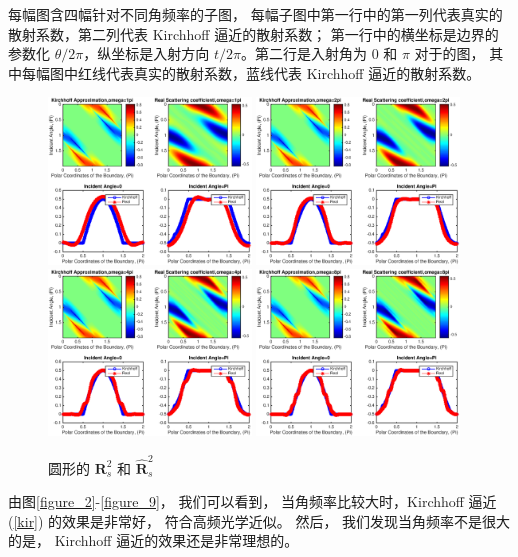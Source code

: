 { 每幅图含四幅针对不同角频率的子图， 每幅子图中第一行中的第一列代表真实的散射系数，第二列代表 Kirchhoff 逼近的散射系数； 第一行中的横坐标是边界的参数化 $\theta/2\pi$，纵坐标是入射方向 $t/2\pi$。第二行是入射角为 $0$ 和 $\pi$ 对于的图， 其中每幅图中红线代表真实的散射系数，蓝线代表 Kirchhoff 逼近的散射系数。
\begin{figure}[htbp]
	\centering
	\includegraphics[width=0.48\textwidth]{./Img/figure_sc_elastic/sc_s2_circle_1.eps}
	\includegraphics[width=0.48\textwidth]{./Img/figure_sc_elastic/sc_s2_circle_2.eps}
	\includegraphics[width=0.48\textwidth]{./Img/figure_sc_elastic/sc_s2_circle_4.eps}
	\includegraphics[width=0.48\textwidth]{./Img/figure_sc_elastic/sc_s2_circle_8.eps}		
	\caption{圆形的 $\mathbf{R}_s^2$ 和 $\hat {\mathbf{R}}_s^2$ }\label{figure_5}
\end{figure}
由图\ref{figure_2}-\ref{figure_9}， 我们可以看到， 当角频率比较大时，Kirchhoff 逼近 (\ref{kir}) 的效果是非常好， 符合高频光学近似。 然后， 我们发现当角频率不是很大的是， Kirchhoff 逼近的效果还是非常理想的。

}
